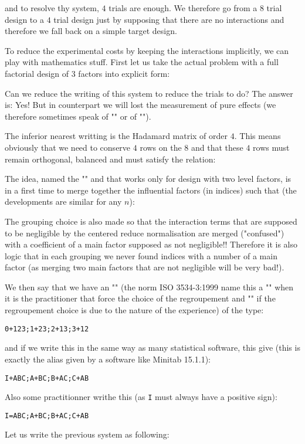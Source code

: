 	and to resolve thy system, $4$ trials are enough. We therefore go from a $8$ trial design to a $4$ trial design just by supposing that there are no interactions and therefore we fall back on a simple target design.
	
	To reduce the experimental costs by keeping the interactions implicitly, we can play with mathematics stuff. First let us take the actual problem with a full factorial design of $3$ factors into explicit form:
	
	Can we reduce the writing of this system to reduce the trials to do? The answer is: Yes! But in counterpart we will lost the measurement of pure effects (we therefore sometimes speak of "" or of "").
		
	The inferior nearest writting is the Hadamard matrix of order $4$. This means obviously that we need to conserve $4$ rows on the $8$ and that these $4$ rows must remain orthogonal, balanced and must satisfy the relation:
	
	The idea, named the "" and that works only for design with two level factors, is in a first time to merge together the influential factors (in indices) such that (the developments are similar for any $n$):
	
	The grouping choice is also made so that the interaction terms that are supposed to be negligible by the centered reduce normalisation are merged ("confused") with a coefficient of a main factor supposed as not negligible!! Therefore it is also logic that in each grouping we never found indices with a number of a main factor (as merging two main factors that are not negligible will be very bad!).
	
	We then say that we have an "" (the norm ISO 3534-3:1999 name this a "" when it is the practitioner that force the choice of the regroupement and "" if the regroupement choice is due to the nature of the experience) of the type:
	 \begin{center}
	 \texttt{0+123;1+23;2+13;3+12}
	 \end{center}
	 and if we write this in the same way as many statistical software, this give (this is exactly the alias given by a software like Minitab 15.1.1):
	\begin{center}
	\texttt{I+ABC;A+BC;B+AC;C+AB}
	\end{center}
	Also some practitionner writhe this (as \texttt{I} must always have a positive sign):
	\begin{center}
	\texttt{I=ABC;A+BC;B+AC;C+AB}
	\end{center}
	Let us write the previous system as following:	
	
